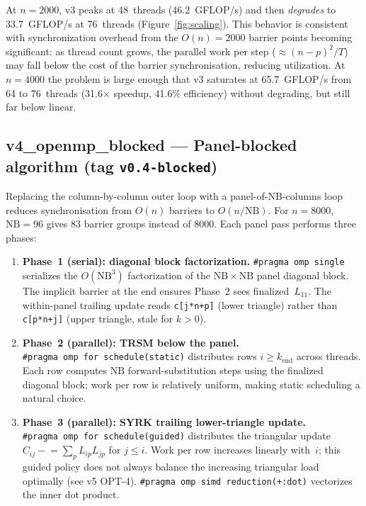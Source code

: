 \documentclass{article}
\begin{document}
At $n=2000$, v3 peaks at 48~threads (46.2~GFLOP/s) and then \emph{degrades}
to 33.7~GFLOP/s at 76~threads (Figure~\ref{fig:scaling}).
This behavior is consistent with synchronization overhead from the $O(n)=2000$
barrier points becoming significant: as thread count grows, the parallel work
per step ($\approx(n-p)^2/T$) may fall below the cost of the barrier
synchronisation, reducing utilization.
At $n=4000$ the problem is large enough that v3 saturates at 65.7~GFLOP/s from
64 to 76~threads (31.6$\times$ speedup, 41.6\% efficiency) without degrading,
but still far below linear.

\subsection{v4\_openmp\_blocked --- Panel-blocked algorithm (tag \texttt{v0.4-blocked})}

Replacing the column-by-column outer loop with a panel-of-$\mathrm{NB}$-columns
loop reduces synchronisation from $O(n)$ barriers to $O(n/\mathrm{NB})$.
For $n=8000$, $\mathrm{NB}=96$ gives 83 barrier groups instead of 8000.
Each panel pass performs three phases:

\begin{enumerate}
  \item \textbf{Phase~1 (serial): diagonal block factorization.}
    \texttt{\#pragma~omp~single} serializes the $O(\mathrm{NB}^3)$ factorization of
    the $\mathrm{NB}\times\mathrm{NB}$ panel diagonal block.
    The implicit barrier at the end ensures Phase~2 sees finalized~$L_{11}$.
    The within-panel trailing update reads \texttt{c[j*n+p]} (lower triangle)
    rather than \texttt{c[p*n+j]} (upper triangle, stale for $k>0$).

  \item \textbf{Phase~2 (parallel): TRSM below the panel.}
    \texttt{\#pragma~omp~for~schedule(static)} distributes rows $i \geq k_\mathrm{end}$
    across threads.
    Each row computes $\mathrm{NB}$ forward-substitution steps using the
    finalized diagonal block; work per row is relatively uniform, making static
    scheduling a natural choice.

  \item \textbf{Phase~3 (parallel): SYRK trailing lower-triangle update.}
    \texttt{\#pragma~omp~for~schedule(guided)} distributes the triangular update
    $C_{ij} \mathrel{-}= \sum_p L_{ip}L_{jp}$ for $j \leq i$.
    Work per row increases linearly with~$i$; this guided policy does not always
    balance the increasing triangular load optimally (see v5 OPT-4).
    \texttt{\#pragma~omp~simd reduction(+:dot)} vectorizes the inner dot product.
\end{enumerate}
\end{document}
